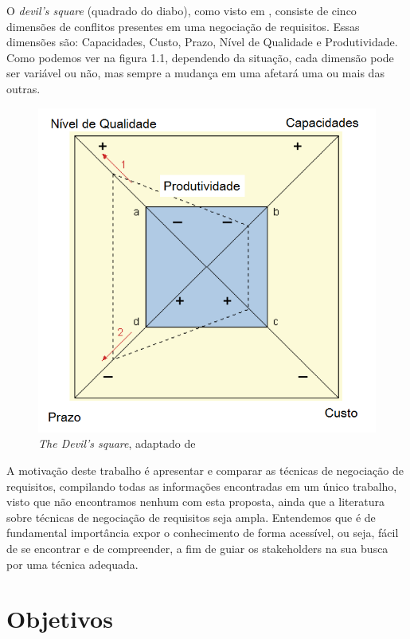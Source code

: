 O \textit{devil's square} (quadrado do diabo), como visto em
\cite{grunbacher2001surfacing}, consiste de cinco dimensões de conflitos
presentes em uma negociação de requisitos. Essas dimensões são: Capacidades,
Custo, Prazo, Nível de Qualidade e Produtividade. Como podemos ver na figura
1.1, dependendo da situação, cada dimensão pode ser variável ou não, mas sempre
a mudança em uma afetará uma ou mais das outras.

  
\begin{figure}[!ht]
 \centering
 \includegraphics[scale=0.6]{devils_square.png}
 \caption{\label{fig:qpcs}\textit{The Devil's square}, adaptado de
 \cite{grunbacher2001surfacing} }
\end{figure}
 
\FloatBarrier

A motivação deste trabalho é apresentar e comparar as técnicas de negociação de
requisitos, compilando todas as informações encontradas em um único
trabalho, visto que não encontramos nenhum com esta proposta, ainda que a
literatura sobre técnicas de negociação de requisitos seja ampla.
Entendemos que é de fundamental importância expor o conhecimento de forma
acessível, ou seja, fácil de se encontrar e de compreender, a fim de guiar os stakeholders
na sua busca por uma técnica adequada.

 \section{Objetivos}

